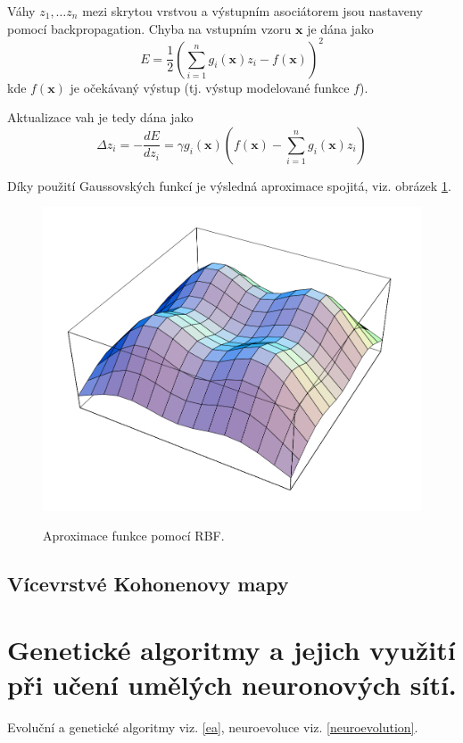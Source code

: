 \documentclass[11pt]{report} %
\renewcommand{\vec}[1]{\mathbf{#1}}
\numberwithin{equation}{section}
\begin{document}
Váhy $z_1, \dots z_n$ mezi skrytou vrstvou a výstupním asociátorem jsou nastaveny pomocí backpropagation. Chyba na vstupním vzoru $\vec{x}$ je dána jako
$$E = \frac{1}{2}\left(\sum_{i=1}^{n} g_i(\vec{x})z_i - f(\vec{x})\right)^2$$
kde $f(\vec{x})$ je očekávaný výstup (tj. výstup modelované funkce $f$).

Aktualizace vah je tedy dána jako
$$\Delta z_i = -\frac{dE}{dz_i} = \gamma g_i(\vec{x})\left(f(\vec{x}) - \sum_{i=1}^{n} g_i(\vec{x})z_i \right)$$

Díky použití Gaussovských funkcí je výsledná aproximace spojitá, viz. obrázek \ref{rbf_gauss}.
\begin{figure}[h]
	\centering
	\includegraphics[scale=0.7]{img/rbf_2.png}
	\label{rbf_gauss}
	\caption{Aproximace funkce pomocí RBF.}
\end{figure}

\subsection{Vícevrstvé Kohonenovy mapy}


\section{Genetické algoritmy a jejich využití při učení umělých neuronových sítí.}
Evoluční a genetické algoritmy viz. \ref{ea}, neuroevoluce viz. \ref{neuroevolution}.
\end{document}

